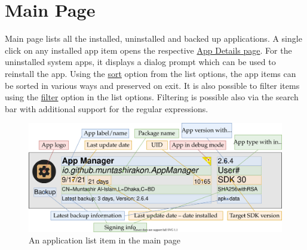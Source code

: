 \section{Main Page}\label{sec:main-page} %
Main page lists all the installed, uninstalled and backed up applications. A single click on any installed app item
opens the respective \hyperref[sec:app-details-page]{App Details page}. For the uninstalled system apps, it displays a
dialog prompt which can be used to reinstall the app. Using the \hyperlink{par:main-page-sort}{sort} option from the
list options, the app items can be sorted in various ways and preserved on exit. It is also possible to filter items
using the \hyperlink{par:main-page-filter}{filter} option in the list options. Filtering is possible also via the search
bar with additional support for the regular expressions.

\begin{figure}[ht]
    \centering
    \includegraphics{../images/main_page_entry_info_labeled.svg}
    \caption{An application list item in the main page} %
    \label{fig:main_page_entry_info_labeled}
\end{figure}

